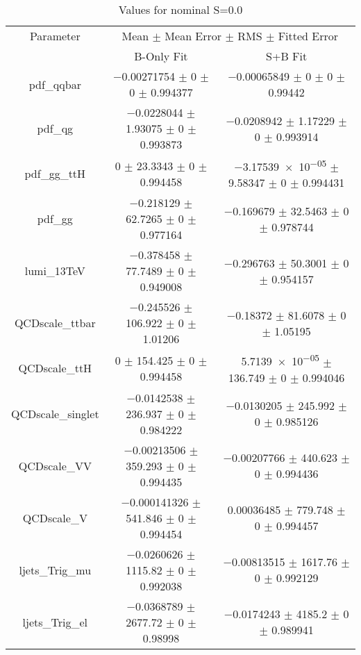 \begin{table}
\centering
\caption{Values for nominal S=0.0}
\begin{tabular}{ccc}
\toprule
Parameter & \multicolumn{2}{c}{Mean $\pm$ Mean Error $\pm$ RMS $\pm$ Fitted Error}\\
 & B-Only Fit & S+B Fit\\
\midrule
pdf\_qqbar & \num{-0.00271754} $\pm$ \num{0} $\pm$ \num{0} $\pm$ \num{0.994377} & \num{-0.00065849} $\pm$ \num{0} $\pm$ \num{0} $\pm$ \num{0.99442}\\
pdf\_qg & \num{-0.0228044} $\pm$ \num{1.93075} $\pm$ \num{0} $\pm$ \num{0.993873} & \num{-0.0208942} $\pm$ \num{1.17229} $\pm$ \num{0} $\pm$ \num{0.993914}\\
pdf\_gg\_ttH & \num{0} $\pm$ \num{23.3343} $\pm$ \num{0} $\pm$ \num{0.994458} & \num{-3.17539e-05} $\pm$ \num{9.58347} $\pm$ \num{0} $\pm$ \num{0.994431}\\
pdf\_gg & \num{-0.218129} $\pm$ \num{62.7265} $\pm$ \num{0} $\pm$ \num{0.977164} & \num{-0.169679} $\pm$ \num{32.5463} $\pm$ \num{0} $\pm$ \num{0.978744}\\
lumi\_13TeV & \num{-0.378458} $\pm$ \num{77.7489} $\pm$ \num{0} $\pm$ \num{0.949008} & \num{-0.296763} $\pm$ \num{50.3001} $\pm$ \num{0} $\pm$ \num{0.954157}\\
QCDscale\_ttbar & \num{-0.245526} $\pm$ \num{106.922} $\pm$ \num{0} $\pm$ \num{1.01206} & \num{-0.18372} $\pm$ \num{81.6078} $\pm$ \num{0} $\pm$ \num{1.05195}\\
QCDscale\_ttH & \num{0} $\pm$ \num{154.425} $\pm$ \num{0} $\pm$ \num{0.994458} & \num{5.7139e-05} $\pm$ \num{136.749} $\pm$ \num{0} $\pm$ \num{0.994046}\\
QCDscale\_singlet & \num{-0.0142538} $\pm$ \num{236.937} $\pm$ \num{0} $\pm$ \num{0.984222} & \num{-0.0130205} $\pm$ \num{245.992} $\pm$ \num{0} $\pm$ \num{0.985126}\\
QCDscale\_VV & \num{-0.00213506} $\pm$ \num{359.293} $\pm$ \num{0} $\pm$ \num{0.994435} & \num{-0.00207766} $\pm$ \num{440.623} $\pm$ \num{0} $\pm$ \num{0.994436}\\
QCDscale\_V & \num{-0.000141326} $\pm$ \num{541.846} $\pm$ \num{0} $\pm$ \num{0.994454} & \num{0.00036485} $\pm$ \num{779.748} $\pm$ \num{0} $\pm$ \num{0.994457}\\
ljets\_Trig\_mu & \num{-0.0260626} $\pm$ \num{1115.82} $\pm$ \num{0} $\pm$ \num{0.992038} & \num{-0.00813515} $\pm$ \num{1617.76} $\pm$ \num{0} $\pm$ \num{0.992129}\\
ljets\_Trig\_el & \num{-0.0368789} $\pm$ \num{2677.72} $\pm$ \num{0} $\pm$ \num{0.98998} & \num{-0.0174243} $\pm$ \num{4185.2} $\pm$ \num{0} $\pm$ \num{0.989941}\\

\end{tabular}
\end{table}
